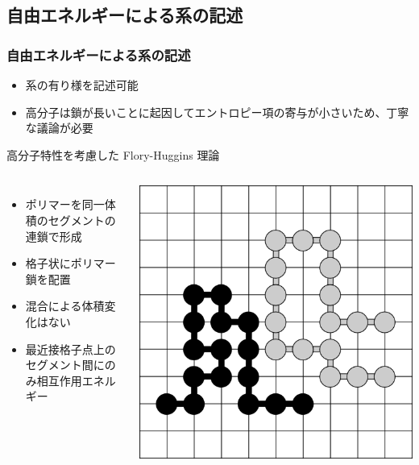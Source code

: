 \documentclass[12pt, dvipdfmx]{beamer}
\begin{document}
\subsection{自由エネルギーによる系の記述}
\begin{frame}\frametitle{自由エネルギーによる系の記述}
	\begin{itemize}
		\item 系の\alert{有り様}を記述可能
		\item \alert{高分子は鎖が長いことに起因してエントロピー項の寄与が小さいため、丁寧な議論が必要}
	\end{itemize}

	\begin{block}{高分子特性を考慮した Flory-Huggins 理論}
		\begin{columns}[c, onlytextwidth]
			\begin{itemize}
				\item ポリマーを同一体積のセグメントの連鎖で形成
				\item 格子状にポリマー鎖を配置
				\item 混合による体積変化はない
				\item 最近接格子点上のセグメント間にのみ相互作用エネルギー
			\end{itemize}
					\centering
						\includegraphics[width=\textwidth]{FH_model.png}
				
		\end{columns}
	\end{block}
\end{frame}
\end{document}
